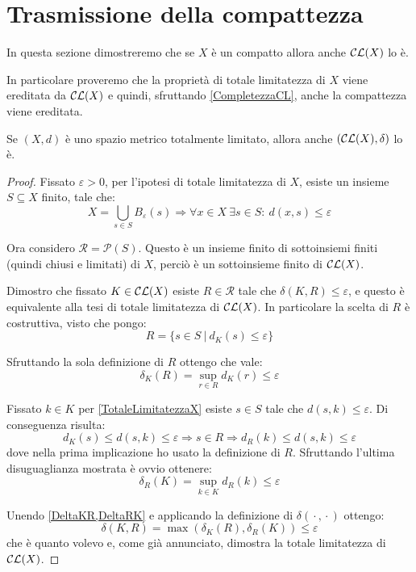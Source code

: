 \section{Trasmissione della compattezza}
In questa sezione dimostreremo che se $X$ è un compatto allora anche $\mathcal{CL}(X)$ lo è. 

In particolare proveremo che la proprietà di totale limitatezza di $X$ viene ereditata da $\mathcal{CL}(X)$ e quindi, sfruttando \cref{CompletezzaCL}, anche la compattezza viene ereditata.

\begin{lemma}\label{TotaleLimitatezzaCL}
	Se $(X,d)$ è uno spazio metrico totalmente limitato, allora anche $(\mathcal{CL}(X),\delta)$ lo è.
\end{lemma}
\begin{proof}
	Fissato $\varepsilon>0$, per l'ipotesi di totale limitatezza di $X$, esiste un insieme $S\subseteq X$ finito, tale che:
	\begin{equation}\label{TotaleLimitatezzaX}
		X=\bigcup_{s\in S} B_{\varepsilon}(s) \Longrightarrow 
		\forall x\in X\ \exists s\in S:\ d(x,s)\le \varepsilon
	\end{equation}

	Ora considero $\mathcal{R}=\mathcal{P}(S)$. Questo è un insieme finito di sottoinsiemi finiti (quindi chiusi e limitati) di $X$, perciò è un sottoinsieme finito di $\mathcal{CL}(X)$. 
	
	Dimostro che fissato $K\in\mathcal{CL}(X)$ esiste $R\in \mathcal{R}$ tale che $\delta(K,R)\le \varepsilon$, e questo è equivalente alla tesi di totale limitatezza di $\mathcal{CL}(X)$. In particolare la scelta di $R$ è costruttiva, visto che pongo:
	\begin{equation*}
		R=\{s\in S\ |\ d_K(s)\le \varepsilon\}
	\end{equation*}
	
	Sfruttando la sola definizione di $R$ ottengo che vale:
	\begin{equation}\label{DeltaKR}
		\delta_K(R)=\sup_{r\in R} d_K(r) \le \varepsilon
	\end{equation}
	
	Fissato $k\in K$ per \cref{TotaleLimitatezzaX} esiste $s\in S$ tale che $d(s,k)\le \varepsilon$. Di conseguenza risulta:
	\begin{equation*}
		d_K(s)\le d(s,k) \le \varepsilon \Longrightarrow s\in R \Longrightarrow d_R(k)\le d(s,k)\le \varepsilon
	\end{equation*}
	dove nella prima implicazione ho usato la definizione di $R$. 
	Sfruttando l'ultima disuguaglianza mostrata è ovvio ottenere:
	\begin{equation}\label{DeltaRK}
		\delta_R(K)=\sup_{k\in K} d_R(k) \le  \varepsilon
	\end{equation}
	
	Unendo \cref{DeltaKR,DeltaRK} e applicando la definizione di $\delta({}\cdot{},{}\cdot{})$ ottengo:
	\begin{equation*}
		\delta(K,R)=\max\left(\delta_K(R),\delta_R(K)\right)\le \varepsilon
	\end{equation*}
	che è quanto volevo e, come già annunciato, dimostra la totale limitatezza di $\mathcal{CL}(X)$.
\end{proof}

